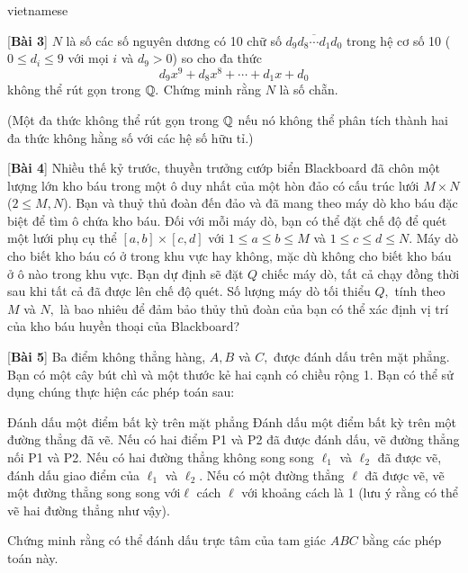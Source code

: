 \documentclass{article}
\begin{document}
\begin{otherlanguage*}{vietnamese}
\begin{problem*}{[\textbf{Bài 3}]}
    $N$ là số các số nguyên dương có 10 chữ số $\overline{d_9 d_8 \cdots d_1 d_0}$ trong hệ cơ số 10 ($0 \le d_i \le 9$ với mọi $i$ và $d_9 > 0$) so cho đa thức
    \[
        d_9 x^9 + d_8 x^8 + \cdots + d_1 x + d_0
    \]
    không thể rút gọn trong $\mathbb Q.$ Chứng minh rằng $N$ là số chẵn.

    (Một đa thức không thể rút gọn trong $\mathbb Q$ nếu nó không thể phân tích thành hai đa thức không hằng số với các hệ số hữu tỉ.)
\end{problem*}

\begin{problem*}{[\textbf{Bài 4}]}
    Nhiều thế kỷ trước, thuyền trưởng cướp biển Blackboard đã chôn một lượng lớn kho báu trong một ô duy nhất của một hòn đảo có cấu trúc lưới $M \times N$ ($2 \le M, N$).
    Bạn và thuỷ thủ đoàn đến đảo và đã mang theo máy dò kho báu đặc biệt để tìm ô chứa kho báu.
    Đối với mỗi máy dò, bạn có thể đặt chế độ để quét một lưới phụ cụ thể $[a, b] \times [c, d]$ với $1 \le a  \le b \le M$ và $1 \le c  \le d \le N.$
    Máy dò cho biết kho báu có ở trong khu vực hay không, mặc dù không cho biết kho báu ở ô nào trong khu vực.
    Bạn dự định sẽ đặt $Q$ chiếc máy dò, tất cả chạy đồng thời sau khi tất cả đã được lên chế độ quét.
    Số lượng máy dò tối thiểu $Q,$ tính theo $M$ và $N,$ là bao nhiêu để đảm bảo thủy thủ đoàn của bạn có thể xác định vị trí của kho báu huyền thoại của Blackboard?
\end{problem*}

\begin{problem*}{[\textbf{Bài 5}]}
    Ba điểm không thẳng hàng, $A, B$ và $C,$ được đánh dấu trên mặt phẳng. Bạn có một cây bút chì và một thước kẻ hai cạnh có chiều rộng 1.
    Bạn có thể sử dụng chúng thực hiện các phép toán sau:
    \begin{itemize}[topsep=0pt, partopsep=0pt, itemsep=0pt]
        \ii Đánh dấu một điểm bất kỳ trên mặt phẳng
        \ii Đánh dấu một điểm bất kỳ trên một đường thẳng đã vẽ.
        \ii Nếu có hai điểm P1 và P2 đã được đánh dấu, vẽ đường thẳng nối P1 và P2.
        \ii Nếu có hai đường thẳng không song song $\ell_1$ và $\ell_2$ đã được vẽ, đánh dấu giao điểm của $\ell_1$ và $\ell_2.$
        \ii Nếu có một đường thẳng $\ell$ đã được vẽ, vẽ một đường thẳng song song với$\ell$ cách $\ell$ với khoảng cách là 1 (lưu ý rằng có thể vẽ hai đường thẳng như vậy).
    \end{itemize}
    Chứng minh rằng có thể đánh dấu trực tâm của tam giác $ABC$ bằng các phép toán này.
\end{problem*}

\end{otherlanguage*}
\end{document}
